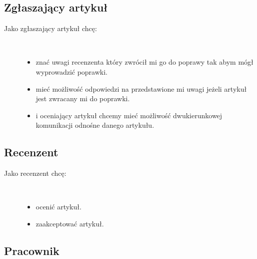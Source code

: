 \subsection{Zgłaszający artykuł}

\begin{description}
  \item[Jako zgłaszający artykuł chcę:] \hfill \\
  \begin{itemize}
    \item znać uwagi recenzenta który zwrócił mi go do poprawy tak abym mógł wyprowadzić poprawki.\\
    \item mieć możliwość odpowiedzi na przedstawione mi uwagi jeżeli artykuł jest zwracany mi do poprawki.\\
    \item i oceniający artykuł chcemy mieć możliwość dwukierunkowej komunikacji odnośne danego artykułu.
  \end{itemize}
\end{description}




\subsection{Recenzent}

\begin{description}
  \item[Jako recenzent chcę:] \hfill \\
  \begin{itemize}
    \item ocenić artykuł.\\
    \item zaakceptować artykuł.\\
  \end{itemize}
\end{description}




\subsection{Pracownik}


